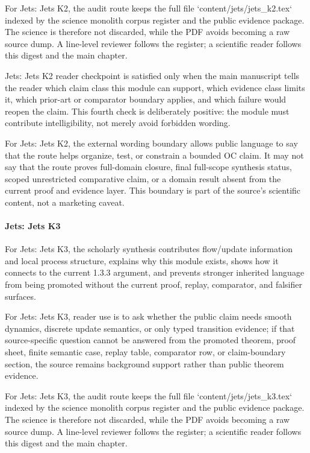 For Jets: Jets K2, the audit route keeps the full file `content/jets/jets\_k2.tex` indexed by the science monolith corpus register and the public evidence package. The science is therefore not discarded, while the PDF avoids becoming a raw source dump. A line-level reviewer follows the register; a scientific reader follows this digest and the main chapter.


Jets: Jets K2 reader checkpoint is satisfied only when the main manuscript tells the reader which claim class this module can support, which evidence class limits it, which prior-art or comparator boundary applies, and which failure would reopen the claim. This fourth check is deliberately positive: the module must contribute intelligibility, not merely avoid forbidden wording.


For Jets: Jets K2, the external wording boundary allows public language to say that the route helps organize, test, or constrain a bounded OC claim. It may not say that the route proves full-domain closure, final full-scope synthesis status, scoped unrestricted comparative claim, or a domain result absent from the current proof and evidence layer. This boundary is part of the source's scientific content, not a marketing caveat.


\paragraph{Jets: Jets K3}

For Jets: Jets K3, the scholarly synthesis contributes flow/update information and local process structure, explains why this module exists, shows how it connects to the current 1.3.3 argument, and prevents stronger inherited language from being promoted without the current proof, replay, comparator, and falsifier surfaces.


For Jets: Jets K3, reader use is to ask whether the public claim needs smooth dynamics, discrete update semantics, or only typed transition evidence; if that source-specific question cannot be answered from the promoted theorem, proof sheet, finite semantic case, replay table, comparator row, or claim-boundary section, the source remains background support rather than public theorem evidence.


For Jets: Jets K3, the audit route keeps the full file `content/jets/jets\_k3.tex` indexed by the science monolith corpus register and the public evidence package. The science is therefore not discarded, while the PDF avoids becoming a raw source dump. A line-level reviewer follows the register; a scientific reader follows this digest and the main chapter.


